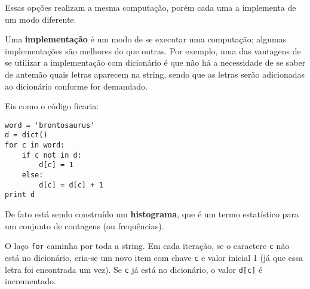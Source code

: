 Essas opções realizam a mesma computação, porém cada uma a implementa de um modo diferente.


Uma {\bf implementação} é um modo de se executar uma computação; algumas implementações são melhores do que outras. Por exemplo, uma das vantagens de se utilizar a implementação com dicionário é que não há a necessidade de se saber de antemão quais letras aparecem na string, sendo que as letras serão adicionadas ao dicionário conforme for demandado.

Eis como o código ficaria:

\beforeverb
\begin{verbatim}
word = 'brontosaurus'
d = dict()
for c in word:
    if c not in d:
        d[c] = 1
    else:
        d[c] = d[c] + 1
print d
\end{verbatim}
\afterverb
%

De fato está sendo construído um {\bf histograma}, que é um termo estatístico para um conjunto de contagens (ou frequências).


O laço {\tt for} caminha por toda a string. Em cada iteração, se o caractere {\tt c} não está no dicionário, cria-se um novo item com chave {\tt c} e valor inicial 1 (já que essa letra foi encontrada um vez). Se {\tt c} já está no dicionário, o valor {\tt d[c]} é incrementado.


